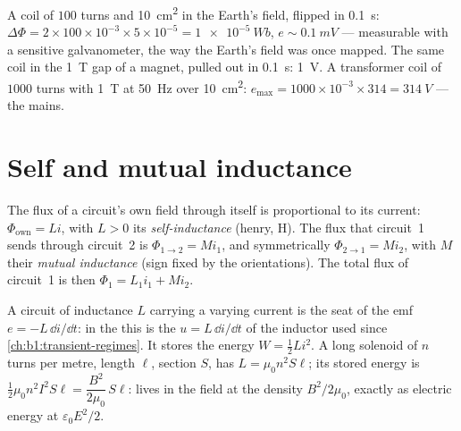 \begin{example}\label{ex:b1:induction:orders}
A coil of $100$ turns and \qty{10}{cm^2} in the Earth's field, flipped in
\qty{0.1}{s}: $\Delta\Phi = 2 \times 100 \times 10^{-3} \times 5 \times 10^{-5} = \qty{1e-5}{Wb}$,
$e \sim \qty{0.1}{mV}$ --- measurable with a sensitive galvanometer, the way
the Earth's field was once mapped. The same coil in the \qty{1}{T} gap
of a magnet, pulled out in \qty{0.1}{s}: \qty{1}{V}. A transformer coil of
$1000$ turns with \qty{1}{T} at \qty{50}{Hz} over \qty{10}{cm^2}: $e_{\max} =
1000 \times 10^{-3} \times 314 = \qty{314}{V}$ --- the mains.
\end{example}

\section{Self and mutual inductance}

\begin{definition}[Inductance]\label{def:b1:induction:inductance}
The flux of a circuit's own field through itself is proportional to its
current: $\Phi_{\text{own}} = Li$, with $L > 0$ its \emph{self-inductance}
(henry, \unit{H}). The flux that circuit~1 sends through circuit~2 is
$\Phi_{1 \to 2} = Mi_1$, and symmetrically $\Phi_{2 \to 1} = Mi_2$, with $M$
their \emph{mutual inductance} (sign fixed by the orientations). The
total flux of circuit~1 is then $\Phi_1 = L_1i_1 + Mi_2$.
\end{definition}

\begin{proposition}\label{prop:b1:induction:inductor}
A circuit of inductance $L$ carrying a varying current is the seat of
the emf $e = -L\,\dd i/\dd t$: in the  this is the
 $u = L\,\dd i/\dd t$ of the inductor used since
\cref{ch:b1:transient-regimes}. It stores the energy $W = \tfrac12Li^2$.
A long solenoid of $n$ turns per metre, length $\ell$, section $S$,
has $L = \mu_0n^2S\ell$; its stored energy is $\tfrac12\mu_0n^2I^2S\ell =
\dfrac{B^2}{2\mu_0}\,S\ell$:  lives in the field at the
density $B^2/2\mu_0$, exactly as electric energy at $\varepsilon_0E^2/2$.
\end{proposition}

